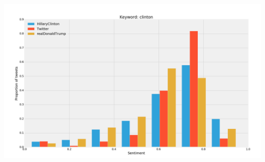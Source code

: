 \documentclass{beamer}
\begin{document}
\begin{frame}[fragile]
\begin{columns}[T]
\begin{column}{.63\textwidth}
\begin{columns}
        \includegraphics[scale=0.585]{./Pics/hist-clinton.png}
\end{columns}









\end{column}
\end{columns}
\end{frame}
\end{document}

